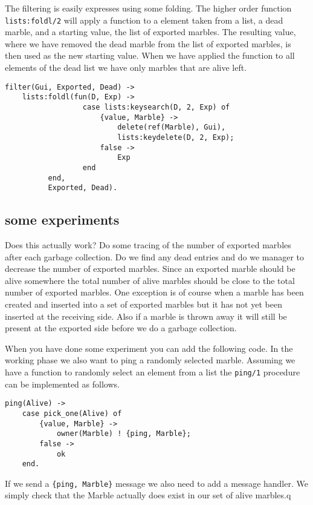 \documentclass[a4paper,11pt]{article}
\begin{document}
The filtering is easily expresses using some folding. The higher order
function {\tt lists:foldl/2} will apply a function to a element taken
from a list, a dead marble, and a starting value, the list of exported
marbles. The resulting value, where we have removed the dead marble
from the list of exported marbles, is then used as the new starting
value. When we have applied the function to all elements of the dead
list we have only marbles that are alive left.

\begin{verbatim}
filter(Gui, Exported, Dead) ->
    lists:foldl(fun(D, Exp) -> 
                  case lists:keysearch(D, 2, Exp) of
                      {value, Marble} ->
                          delete(ref(Marble), Gui),
                          lists:keydelete(D, 2, Exp);
                      false ->
                          Exp
                  end
          end,
          Exported, Dead).
\end{verbatim}

\subsection{some experiments}

Does this actually work? Do some tracing of the number of exported
marbles after each garbage collection. Do we find any dead entries and
do we manager to decrease the number of exported marbles. Since an
exported marble should be alive somewhere the total number of alive
marbles should be close to the total number of exported marbles. One
exception is of course when a marble has been created and inserted
into a set of exported marbles but it has not yet been inserted at the
receiving side. Also if a marble is thrown away it will still be
present at the exported side before we do a garbage collection.

When you have done some experiment you can add the following code. In the working phase we also want to ping a randomly selected marble.  Assuming we have a function to randomly select an element from a list the {\tt ping/1} procedure can be implemented as follows.

\begin{verbatim}
ping(Alive) ->
    case pick_one(Alive) of
        {value, Marble} ->
            owner(Marble) ! {ping, Marble};
        false ->
            ok
    end.
\end{verbatim}

If we send a {\tt \{ping, Marble\}} message we also need to add a message handler. We simply check that the Marble actually does exist in our set of alive marbles.q
\end{document}
